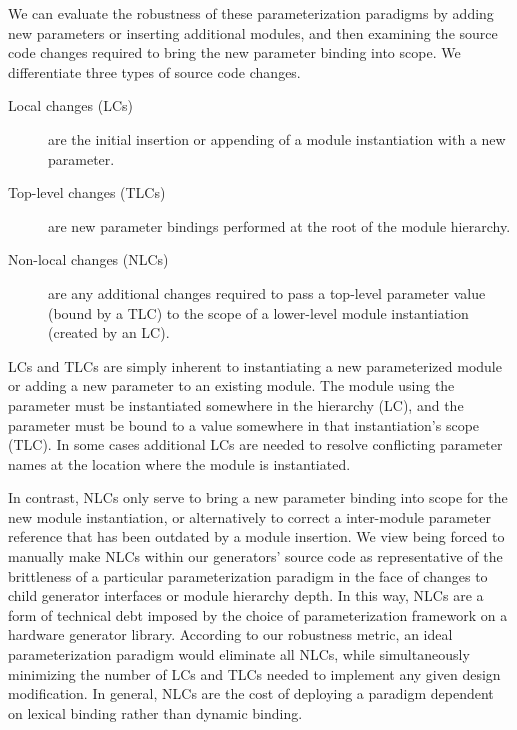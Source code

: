 We can evaluate the robustness of these parameterization paradigms by adding new parameters or inserting additional modules, and then examining the source code changes required to bring the new parameter binding into scope. 
We differentiate three types of source code changes.

\begin{description}
\item[Local changes (LCs)] are the initial insertion or appending of a module instantiation with a new parameter. 
\item[Top-level changes (TLCs)] are new parameter bindings performed at the root of the module hierarchy. 
\item[Non-local changes (NLCs)] are any additional changes required to pass a top-level parameter value (bound by a TLC) to the scope of a lower-level module instantiation (created by an LC). 
\end{description}

LCs and TLCs are simply inherent to instantiating a new parameterized module or adding a new parameter to an existing module.
The module using the parameter must be instantiated somewhere in the hierarchy (LC), and the parameter must be bound to a value
somewhere in that instantiation's scope (TLC).
In some cases additional LCs are needed to resolve conflicting parameter names at the location where the module is instantiated.

In contrast, NLCs only serve to bring a new parameter binding into scope for the new module instantiation,
or alternatively to correct a inter-module parameter reference that has been outdated by a module insertion.
We view being forced to manually make NLCs within our generators' source code as representative of
the brittleness of a particular parameterization paradigm in the face of changes to child generator interfaces
or module hierarchy depth.
In this way, NLCs are a form of technical debt imposed by the choice of parameterization framework on a hardware generator library.
According to our robustness metric, an ideal parameterization paradigm would eliminate all NLCs,
while simultaneously minimizing the number of LCs and TLCs needed to implement any given design modification.
In general, NLCs are the cost of deploying a paradigm dependent on lexical binding rather than dynamic binding.


